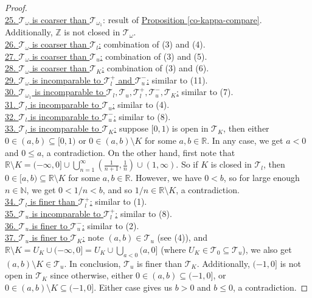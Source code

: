 \documentclass{treatise}
\begin{document}
\begin{proof}
\\
\underline{25. $\mathcal{T}_\omega$ is coarser than $\mathcal{T}_{\omega_1}$}: result of \hyperref[co-kappa-compare]{Proposition \ref*{co-kappa-compare}}. Additionally, $\mathbb{Z}$ is not closed in $\mathcal{T}_\omega$.
\\
\underline{26. $\mathcal{T}_\omega$ is coarser than $\mathcal{T}_l$:} combination of (3) and (4).
\\
\underline{27. $\mathcal{T}_\omega$ is coarser than $\mathcal{T}_u$:} combination of (3) and (5).
\\
\underline{28. $\mathcal{T}_\omega$ is coarser than $\mathcal{T}_K$:} combination of (3) and (6).
\\
\underline{29. $\mathcal{T}_\omega$ is incomparable to $\mathcal{T}_l^+$ and $\mathcal{T}_u^-$:} similar to (11).
\\
\underline{30. $\mathcal{T}_{\omega_1}$ is incomparable to $\mathcal{T}_l, \mathcal{T}_u, \mathcal{T}_l^+, \mathcal{T}_u^-, \mathcal{T}_K$:} similar to (7).
\\
\underline{31. $\mathcal{T}_l$ is incomparable to $\mathcal{T}_u$:} similar to (4).
\\
\underline{32. $\mathcal{T}_l$ is incomparable to $\mathcal{T}_u^-$:} similar to (8).
\\
\underline{33. $\mathcal{T}_l$ is incomparable to $\mathcal{T}_K$:} suppose $[0, 1)$ is open in $\mathcal{T}_K$, then either $0 \in (a, b) \subseteq [0, 1)$ or $0 \in (a, b) \setminus K$ for some $a, b \in \mathbb{R}$. In any case, we get $a < 0$ and $0 \leq a$, a contradiction. On the other hand, first note that $\mathbb{R} \setminus K = (-\infty, 0] \cup \bigcup_{n = 1}^\infty \left( \frac{1}{n + 1}, \frac{1}{n} \right) \cup (1, \infty)$. So if $K$ is closed in $\mathcal{T}_l$, then $0 \in [a, b) \subseteq \mathbb{R} \setminus K$ for some $a, b \in \mathbb{R}$. However, we have $0 < b$, so for large enough $n \in \mathbb{N}$, we get $0 < 1/n < b$, and so $1/n \in \mathbb{R} \setminus K$, a contradiction.
\\
\underline{34. $\mathcal{T}_l$ is finer than $\mathcal{T}_l^+$:} similar to (1).
\\
\underline{35. $\mathcal{T}_u$ is incomparable to $\mathcal{T}_l^+$:} similar to (8).
\\
\underline{36. $\mathcal{T}_u$ is finer to $\mathcal{T}_u^-$:} similar to (2).
\\
\underline{37. $\mathcal{T}_u$ is finer to $\mathcal{T}_K$:} note $(a, b) \in \mathcal{T}_u$ (see (4)), and $\mathbb{R} \setminus K = U_K \cup (-\infty, 0] = U_K \cup \bigcup_{a < 0} (a, 0]$ (where $U_K \in \mathcal{T}_0 \subseteq \mathcal{T}_u$), we also get $(a, b) \setminus K \in \mathcal{T}_u$. In conclusion, $\mathcal{T}_u$ is finer than $\mathcal{T}_K$. Additionally, $(-1, 0]$ is not open in $\mathcal{T}_K$ since otherwise, either $0 \in (a, b) \subseteq (-1, 0]$, or $0 \in (a, b) \setminus K \subseteq (-1, 0]$. Either case gives us $b > 0$ and $b \leq 0$, a contradiction.

\end{proof}
\end{document}
